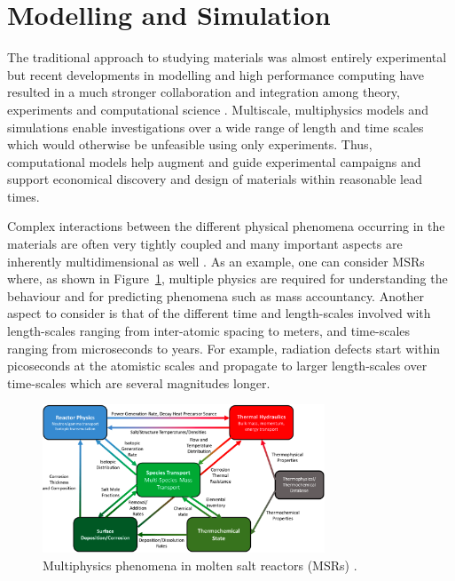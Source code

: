 \section{Modelling and Simulation}
	The traditional approach to studying materials was almost entirely experimental but recent developments in modelling and high performance computing have resulted in a much stronger collaboration and integration among theory, experiments and computational science \cite{STAN200920}. Multiscale, multiphysics models and simulations enable investigations over a wide range of length and time scales which would otherwise be unfeasible using only experiments. Thus, computational models help augment and guide experimental campaigns and support economical discovery and design of materials within reasonable lead times.

	Complex interactions between the different physical phenomena occurring in the materials are often very tightly coupled and many important aspects are inherently multidimensional  as well \cite{WILLIAMSON2012149}. As an example, one can consider MSRs where, as shown in Figure~\ref{fig:msr_mf}, multiple physics  are required for understanding the behaviour and for predicting phenomena such as mass accountancy. Another aspect to consider is that of the different time and length-scales involved with length-scales ranging from inter-atomic spacing to meters, and time-scales ranging from microseconds to years. For example, radiation defects start within picoseconds at the atomistic scales and propagate to larger length-scales over time-scales which are several magnitudes longer.
	\begin{figure}[htb]
		\centering
		\includegraphics[width=0.75\textwidth]{figures/chapter-1/MSR_MP}
		\caption[Multiphysics phenomena in molten salt reactors (MSRs).]{Multiphysics phenomena in molten salt reactors (MSRs) \cite{McMurray:2021aa}.}
		\label{fig:msr_mf}
	\end{figure}
	
